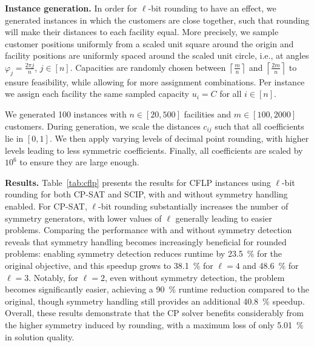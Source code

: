 \documentclass[runningheads]{llncs}
\begin{document}
\textbf{Instance generation.}
In order for $\ell$-bit rounding to have an effect, we generated instances in which the customers are close together, such that rounding will make their distances to each facility equal. More precisely, we sample customer positions uniformly from a scaled unit square around the origin and facility positions are uniformly spaced around the scaled unit circle, i.e., at angles $\varphi_j = \frac{2\pi j}{n}$, $j \in [n]$. Capacities are randomly chosen between $\left\lceil\frac{m}{n}\right\rceil$ and $\left\lceil\frac{2m}{n}\right\rceil$ to ensure feasibility, while allowing for more assignment combinations. Per instance we assign each facility the same sampled capacity  $u_i = C$ for all $i \in [n]$. 

We generated 100 instances with $n \in [20, 500]$ facilities and $m \in [100, 2000]$ customers. During generation, we scale the distances $c_{ij}$ such that all coefficients lie in $[0, 1]$. We then apply varying levels of decimal point rounding, with higher levels leading to less symmetric coefficients.
Finally, all coefficients are scaled by $10^6$ to ensure they are large enough. 

\textbf{Results.}\label{sec:results_facloc}
Table~\ref{tab:cflp} presents the results for CFLP instances using $\ell$-bit rounding for both CP-SAT and SCIP, with and without symmetry handling enabled.
For CP-SAT, $\ell$-bit rounding substantially increases the number of symmetry generators, with lower values of $\ell$ generally leading to easier problems.
 Comparing the performance with and without symmetry detection reveals that symmetry handling becomes increasingly beneficial for rounded problems: enabling symmetry detection reduces runtime by \SI{23.5}{\percent} for the original objective, and this speedup grows to \SI{38.1}{\percent} for $\ell=4$ and
  \SI{48.6}{\percent} for $\ell=3$. Notably, for $\ell=2$, even without symmetry detection, the problem becomes significantly easier, achieving a \SI{90}{\percent} runtime reduction compared to the original, though symmetry handling still provides an additional \SI{40.8}{\percent} speedup. Overall, these results demonstrate that the CP solver benefits considerably from the higher
   symmetry induced by rounding, with a maximum loss of only \SI{5.01}{\percent} in solution quality.
   
\end{document}
